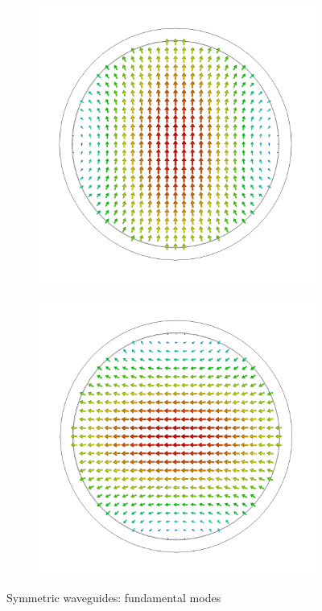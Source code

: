 \documentclass[11pt,a4paper,twoside,openany]{report}
\begin{document}
\begin{figure}[!ht]
    \begin{subfigure}{.45\textwidth}
        \centering
        \includegraphics[width=.75\textwidth]{src/waveguide_circular_mode1.png}
        \caption{\label{fig:circular-waveguide-mode1}}
    \end{subfigure}
    \hspace{0.5cm}
    \begin{subfigure}{.45\textwidth}
        \centering
        \includegraphics[width=.75\textwidth]{src/waveguide_circular_mode2.png}
        \caption{\label{fig:circular-waveguide-mode2}}
    \end{subfigure}
    \caption{\label{fig:symmetric-waveguide-modes}Symmetric waveguides: fundamental modes}
\end{figure}
\end{document}
